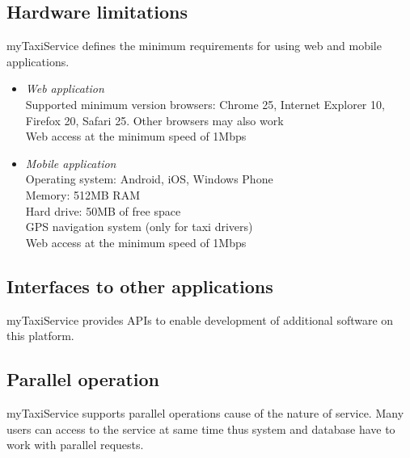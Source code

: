\subsection{Hardware limitations}
myTaxiService defines the minimum requirements for using web and mobile applications.
\begin{itemize}
	\item \textit{Web application}\\
	Supported minimum version browsers: Chrome 25, Internet Explorer 10, Firefox 20, Safari 25. Other browsers may also work\\
	Web access at the minimum speed of 1Mbps
	\item \textit{Mobile application}\\
	Operating system: Android, iOS, Windows Phone\\
	Memory: 512MB RAM\\
	Hard drive: 50MB of free space\\
	GPS navigation system (only for taxi drivers)\\
	Web access at the minimum speed of 1Mbps
\end{itemize}

\subsection{Interfaces to other applications}
myTaxiService provides APIs to enable development of additional software on this platform.

\subsection{Parallel operation}
myTaxiService supports parallel operations cause of the nature of service. Many users can access to the service at same time thus system and database have to work with parallel requests.


